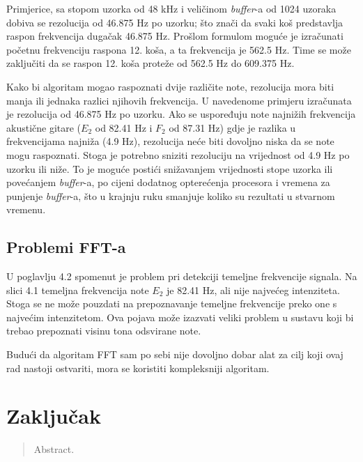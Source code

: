 \documentclass[times, utf8, zavrsni, numeric]{fer}
\begin{document}
Primjerice, sa stopom uzorka od 48 kHz i veličinom \textit{buffer}-a od 1024 uzoraka dobiva se rezolucija od 46.875 Hz po uzorku; što znači da svaki koš predstavlja raspon frekvencija dugačak 46.875 Hz. Prošlom formulom moguće je izračunati početnu frekvenciju raspona 12. koša, a ta frekvencija je 562.5 Hz. Time se može zaključiti da se raspon 12. koša proteže od 562.5 Hz do 609.375 Hz.

Kako bi algoritam mogao raspoznati dvije različite note, rezolucija mora biti manja ili jednaka razlici njihovih frekvencija.
U navedenome primjeru izračunata je rezolucija od 46.875 Hz po uzorku. Ako se uspoređuju note najnižih frekvencija akustične gitare ($E_2$ od 82.41 Hz i $F_2$ od 87.31 Hz) gdje je razlika u frekvencijama najniža (4.9 Hz), rezolucija neće biti dovoljno niska da se note mogu raspoznati. Stoga je potrebno sniziti rezoluciju na vrijednost od 4.9 Hz po uzorku ili niže. To je moguće postići snižavanjem vrijednosti stope uzorka ili povećanjem \textit{buffer}-a, po cijeni dodatnog opterećenja procesora i vremena za punjenje \textit{buffer}-a, što u krajnju ruku smanjuje koliko su rezultati u stvarnom vremenu.

\section{Problemi FFT-a}
U poglavlju 4.2 spomenut je problem pri detekciji temeljne frekvencije signala. Na slici 4.1 temeljna frekvencija note $E_2$ je 82.41 Hz, ali nije najvećeg intenziteta. Stoga se ne može pouzdati na prepoznavanje temeljne frekvencije preko one s najvećim intenzitetom. Ova pojava može izazvati veliki problem u sustavu koji bi trebao prepoznati visinu tona odsvirane note.

Budući da algoritam FFT sam po sebi nije dovoljno dobar alat za cilj koji ovaj rad nastoji ostvariti, mora se koristiti kompleksniji algoritam.


\chapter{Zaključak}




\begin{sazetak}

\end{sazetak}

\begin{abstract}
Abstract.

\end{abstract}
\end{document}

